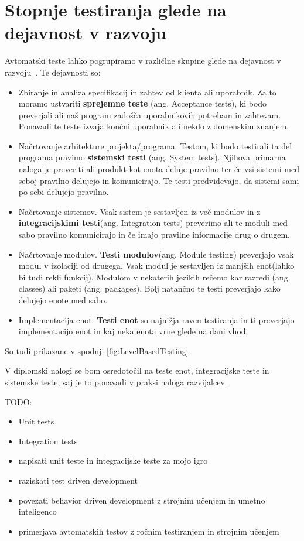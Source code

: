 \section{Stopnje testiranja glede na dejavnost v razvoju}
Avtomatski teste lahko pogrupiramo v različlne skupine glede na dejavnost v razvoju~\cite{Ammann:2008:IST:1355340}. Te dejavnosti so:
\begin{itemize}
    \item Zbiranje in analiza specifikacij in zahtev od klienta ali uporabnik. Za to moramo ustvariti \textbf{sprejemne teste} (ang. Acceptance tests), ki bodo preverjali ali naš program zadošča uporabnikovih potrebam in zahtevam. Ponavadi te teste izvaja končni uporabnik ali nekdo z domenskim znanjem.
    \item Načrtovanje arhitekture projekta/programa. Testom, ki bodo testirali ta del programa pravimo \textbf{sistemski testi} (ang. System tests). Njihova primarna naloga je preveriti ali produkt kot enota deluje pravilno ter če vsi sistemi med seboj pravilno delujejo in komunicirajo. Te testi predvidevajo, da sistemi sami po sebi delujejo pravilno.
    \item Načrtovanje sistemov. Vsak sistem je sestavljen iz več modulov in z \textbf{integracijskimi testi}(ang. Integration tests) preverimo ali te moduli med sabo pravilno komunicirajo in če imajo pravilne informacije drug o drugem.
    \item Načrtovanje modulov. \textbf{Testi modulov}(ang. Module testing) preverjajo vsak modul v izolaciji od drugega. Vsak modul je sestavljen iz manjših enot(lahko bi tudi rekli funkcij). Modulom v nekaterih jezikih rečemo kar razredi (ang. classes) ali paketi (ang. packages). Bolj natančno te testi preverjajo kako delujejo enote med sabo.
    \item Implementacija enot. \textbf{Testi enot} so najnižja raven testiranja in ti preverjajo implementacijo enot in kaj neka enota vrne glede na dani vhod. 
\end{itemize}
So tudi prikazane v spodnji \ref{fig:LevelBasedTesting}

V diplomski nalogi se bom osredotočil na teste enot, integracijske teste in sistemske teste, saj je to ponavadi v praksi naloga razvijalcev. 




TODO:
\begin{itemize}
    \item Unit tests~\cite{sandi_pangerc}~\cite{gorazd_kovacic}
    \item Integration tests~\cite{sandi_pangerc}~\cite{gorazd_kovacic}
    \item napisati unit teste in integracijske teste za mojo igro~\cite{unity_test_runner}~\cite{nunit}
    \item raziskati test driven development
    \item povezati behavior driven development z strojnim učenjem in umetno inteligenco
    \item primerjava avtomatskih testov z ročnim testiranjem in strojnim učenjem
\end{itemize}
